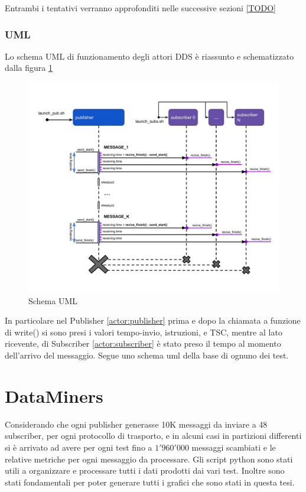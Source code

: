 \noindent Entrambi i tentativi verranno approfonditi nelle successive sezioni \ref{TODO}


\subsubsection{UML}
Lo schema UML di funzionamento degli attori DDS è riassunto e schematizzato dalla figura \ref{fig:uml}
\begin{figure}[H]
    \centering
    \includegraphics[width=\textwidth]{./img/umel-send-receive.png}
    \caption{Schema UML} %
    \label{fig:uml}
\end{figure}

In particolare nel Publisher \ref{actor:publisher} prima e dopo la chiamata a funzione di write() %
si sono presi i valori tempo-invio, istruzioni, e TSC, mentre al lato ricevente, di Subscriber \ref{actor:subscriber} è stato preso il tempo al momento dell'arrivo del messaggio. Segue uno schema uml della base di ognuno dei test.


\section{DataMiners}
Considerando che ogni publisher generasse 10K messaggi da inviare a 48 subscriber, per ogni protocollo di trasporto, e in alcuni casi in partizioni differenti si è arrivato ad avere per ogni test fino a $1'960'000$ messaggi scambiati e le relative metriche per ogni messaggio da processare. 
Gli script python sono stati utili a organizzare e processare tutti i dati prodotti dai vari test. Inoltre sono stati fondamentali per poter generare tutti i grafici che sono stati in questa tesi.

